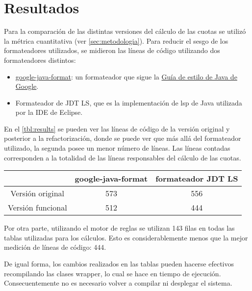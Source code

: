 \section{Resultados}\label{sec:resultados}

Para la comparación de las distintas versiones del cálculo de las cuotas se utilizó la métrica cuantitativa (ver \cref{sec:metodologia}). Para reducir el sesgo de los formateadores utilizados, se midieron las líneas de código utilizando dos formateadores distintos:
\begin{itemize}
    \item \href{https://github.com/google/google-java-format}{google-java-format}: un formateador que sigue la \href{https://google.github.io/styleguide/javaguide.html}{Guía de estilo de Java de Google}.
    \item Formateador de JDT LS, que es la implementación de \acrshort{lsp} de Java utilizada por la IDE de Eclipse.
\end{itemize}
En el \cref{tbl:results} se pueden ver las líneas de código de la versión original y posterior a la refactorización, donde se puede ver que más allá del formateador utilizado, la segunda posee un menor número de líneas. Las líneas contadas corresponden a la totalidad de las líneas responsables del cálculo de las cuotas.

\begin{table*}
\centering
\begin{tabular}{|c|c|c|}
    \hline
    & google-java-format & formateador JDT LS \\ \hline
    Versión original & 573 & 556 \\ \hline
    Versión funcional & 512 & 444 \\ \hline
\end{tabular}
\caption{Líneas de código antes y después del refactorizado}
\label{tbl:results}
\end{table*}

Por otra parte, utilizando el motor de reglas se utilizan 143 filas en todas las tablas utilizadas para los cálculos. Esto es considerablemente menos que la mejor medición de líneas de código: 444.

De igual forma, los cambios realizados en las tablas pueden hacerse efectivos recompilando las clases wrapper, lo cual se hace en tiempo de ejecución. Consecuentemente no es necesario volver a compilar ni desplegar el sistema.
